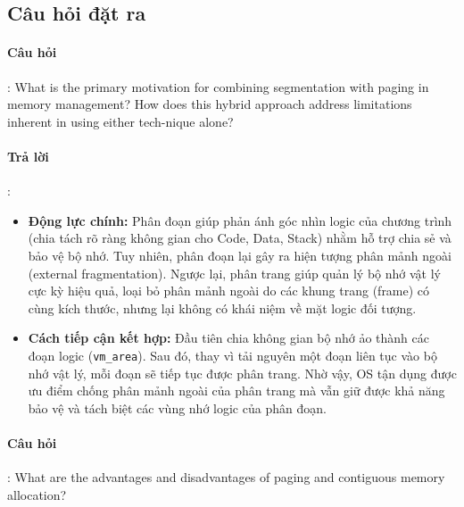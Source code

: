 \documentclass[a4paper]{article}
\begin{document}
\subsection{Câu hỏi đặt ra}
\paragraph{Câu hỏi}: What is the primary motivation for combining segmentation with paging in memory management? How does this hybrid approach address limitations inherent in using either tech-nique alone?

\paragraph{Trả lời}:
\begin{itemize}
    \item \textbf{Động lực chính:} Phân đoạn giúp phản ánh góc nhìn logic của chương trình (chia tách rõ ràng không gian cho Code, Data, Stack) nhằm hỗ trợ chia sẻ và bảo vệ bộ nhớ. Tuy nhiên, phân đoạn lại gây ra hiện tượng phân mảnh ngoài (external fragmentation). Ngược lại, phân trang giúp quản lý bộ nhớ vật lý cực kỳ hiệu quả, loại bỏ phân mảnh ngoài do các khung trang (frame) có cùng kích thước, nhưng lại không có khái niệm về mặt logic đối tượng.
    \item \textbf{Cách tiếp cận kết hợp:} Đầu tiên chia không gian bộ nhớ ảo thành các đoạn logic (\texttt{vm\_area}). Sau đó, thay vì tải nguyên một đoạn liên tục vào bộ nhớ vật lý, mỗi đoạn sẽ tiếp tục được phân trang. Nhờ vậy, OS tận dụng được ưu điểm chống phân mảnh ngoài của phân trang mà vẫn giữ được khả năng bảo vệ và tách biệt các vùng nhớ logic của phân đoạn.
\end{itemize}

\paragraph{Câu hỏi}: What are the advantages and disadvantages of paging and contiguous memory allocation?
\end{document}
